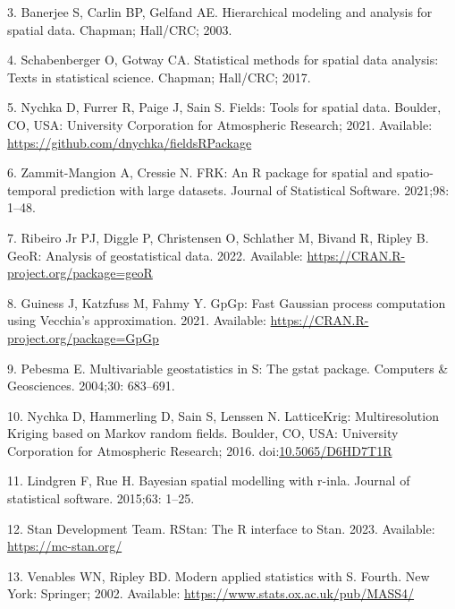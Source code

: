 \documentclass[10pt,letterpaper]{article}
\begin{document}
\leavevmode\hypertarget{ref-banerjee2003hierarchical}{}%
3. Banerjee S, Carlin BP, Gelfand AE. Hierarchical modeling and analysis
for spatial data. Chapman; Hall/CRC; 2003.

\leavevmode\hypertarget{ref-schabenberger2017statistical}{}%
4. Schabenberger O, Gotway CA. Statistical methods for spatial data
analysis: Texts in statistical science. Chapman; Hall/CRC; 2017.

\leavevmode\hypertarget{ref-nychka2021fields}{}%
5. Nychka D, Furrer R, Paige J, Sain S. Fields: Tools for spatial data.
Boulder, CO, USA: University Corporation for Atmospheric Research; 2021.
Available: \url{https://github.com/dnychka/fieldsRPackage}

\leavevmode\hypertarget{ref-zammitmangion2021FRK}{}%
6. Zammit-Mangion A, Cressie N. FRK: An R package for spatial and
spatio-temporal prediction with large datasets. Journal of Statistical
Software. 2021;98: 1--48.

\leavevmode\hypertarget{ref-ribiero2022geoR}{}%
7. Ribeiro Jr PJ, Diggle P, Christensen O, Schlather M, Bivand R, Ripley
B. GeoR: Analysis of geostatistical data. 2022. Available:
\url{https://CRAN.R-project.org/package=geoR}

\leavevmode\hypertarget{ref-guiness2021gpgp}{}%
8. Guiness J, Katzfuss M, Fahmy Y. GpGp: Fast Gaussian process
computation using Vecchia's approximation. 2021. Available:
\url{https://CRAN.R-project.org/package=GpGp}

\leavevmode\hypertarget{ref-pebesma2004gstat}{}%
9. Pebesma E. Multivariable geostatistics in S: The gstat package.
Computers \& Geosciences. 2004;30: 683--691.

\leavevmode\hypertarget{ref-nychka2016latticekrig}{}%
10. Nychka D, Hammerling D, Sain S, Lenssen N. LatticeKrig:
Multiresolution Kriging based on Markov random fields. Boulder, CO, USA:
University Corporation for Atmospheric Research; 2016.
doi:\href{https://doi.org/10.5065/D6HD7T1R}{10.5065/D6HD7T1R}

\leavevmode\hypertarget{ref-lindgren2015bayesian}{}%
11. Lindgren F, Rue H. Bayesian spatial modelling with r-inla. Journal
of statistical software. 2015;63: 1--25.

\leavevmode\hypertarget{ref-rstan2023rstan}{}%
12. Stan Development Team. RStan: The R interface to Stan. 2023.
Available: \url{https://mc-stan.org/}

\leavevmode\hypertarget{ref-venables2002S}{}%
13. Venables WN, Ripley BD. Modern applied statistics with S. Fourth.
New York: Springer; 2002. Available:
\url{https://www.stats.ox.ac.uk/pub/MASS4/}
\end{document}
